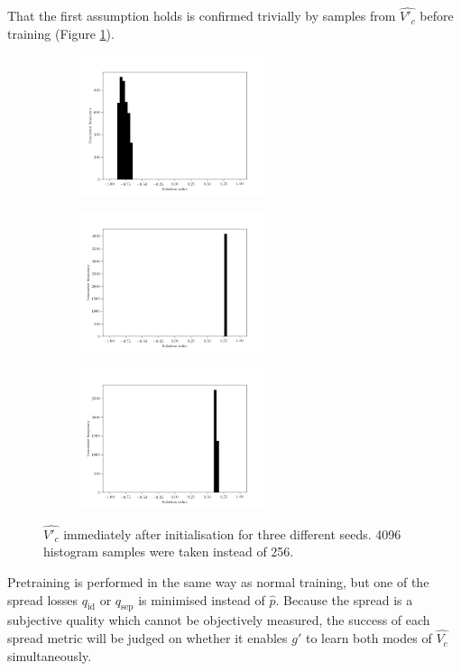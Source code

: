 \documentclass[../../main.tex]{subfiles}
\begin{document}
That the first assumption holds is confirmed trivially by samples from $\hat{V'_c}$ before training (Figure \ref{fig:initialisedGenerator}).
\begin{figure}[H]
    \centering
    \begin{subfigure}[a]{1.\textwidth}
        \centering
        \includegraphics[width=0.6\textwidth]{initialisedGenerator1}
    \end{subfigure}
    \begin{subfigure}[a]{1.\textwidth}
        \centering
        \includegraphics[width=0.6\textwidth]{initialisedGenerator2}
    \end{subfigure}
    \begin{subfigure}[a]{1.\textwidth}
        \centering
        \includegraphics[width=0.6\textwidth]{initialisedGenerator3}
    \end{subfigure}
    \caption{
        $\hat{V'_c}$ immediately after initialisation for three different seeds.
        4096 histogram samples were taken instead of 256.
    }
\label{fig:initialisedGenerator}
\end{figure}
Pretraining is performed in the same way as normal training, but one of the spread losses $q_\text{id}$ or $q_\text{sep}$ is minimised instead of $\hat{p}$.
Because the spread is a subjective quality which cannot be objectively measured, the success of each spread metric will be judged on whether it enables $g'$ to learn both modes of $\hat{V_c}$ simultaneously.
\end{document}
